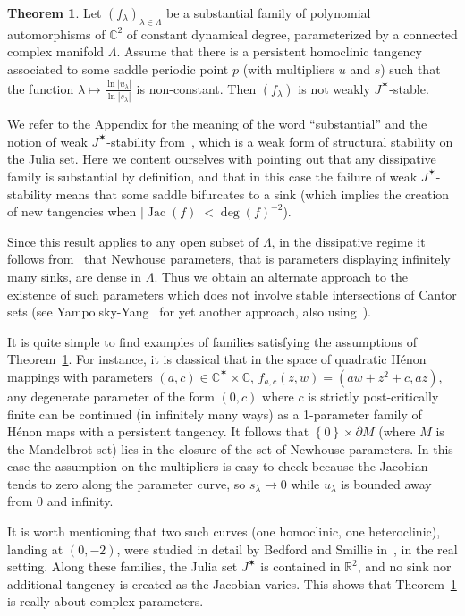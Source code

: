 \documentclass[11pt, oneside]{amsart}
\newcommand{\C}{\mathbb{C}}
\newcommand{\R}{\mathbb{R}}
\newcommand{\fr}{\partial}
\newcommand{\set}[1]{\left\{#1\right\}}
\newcommand{\abs}[1]{\left\vert#1\right\vert}
\newcommand{\jstar}{J^\varstar}
\DeclareMathOperator{\jac}{Jac}
\theoremstyle{remark}
\theoremstyle{definition}
\theoremstyle{theorem}
\newtheorem{mthmB}{Theorem}
\begin{document}
\begin{mthmB}\label{thm:persistent}
Let $(f_\lambda)_{\lambda\in \Lambda}$ be a substantial family of  
polynomial   automorphisms  of $\C^2$ of constant dynamical degree,
 parameterized by a connected complex manifold $\Lambda$. Assume that there is 
 a  persistent homoclinic tangency associated to some saddle periodic point $p$ 
(with multipliers $u$ and $s$) such that 
 the function $\lambda \mapsto \frac{\ln \abs{u_\lambda}}{\ln \abs{s_\lambda}}$ is non-constant. 
Then $(f_\lambda)$ is not weakly $J^\varstar$-stable. 
\end{mthmB}

We refer to the Appendix for 
  the meaning of the word ``substantial'' and the notion of weak $\jstar$-stability from~\cite{tangencies}, which is a weak form of 
  structural stability on the Julia set. Here we content ourselves with 
pointing out  that any dissipative family is substantial by definition, and that in this case the 
failure of weak $\jstar$-stability means that some saddle bifurcates to a sink (which implies the creation of new tangencies when $\abs{\jac(f)} < \deg(f)^{-2}$). 

Since this result applies to any open subset of $\Lambda$, in the dissipative regime 
 it follows from~\cite[Cor. 4.5]{tangencies} 
that Newhouse parameters, that is parameters  displaying  infinitely many sinks,  
 are dense in $\Lambda$. Thus we obtain  an 
alternate approach to the existence of such parameters
which does not involve stable intersections of Cantor sets
(see   Yampolsky-Yang~\cite{yampolsky-yang} for yet another approach, also using~\cite{tangencies}).
 
It is quite simple to find examples of families satisfying the assumptions of 
Theorem~\ref{thm:persistent}. For instance, it is classical that 
in the space of quadratic Hénon mappings with parameters 
$(a,c)\in \C^\varstar\times \C$, 
$f_{a, c}(z,w) = (aw+z^2+c, az)$, any degenerate parameter of the form 
$(0, c)$ where $c$ is strictly post-critically finite can be continued (in infinitely many ways) 
as a 1-parameter family of Hénon maps   with a persistent tangency. 
It follows that $\set{0}\times \fr M $ (where $M$ is the Mandelbrot set)
lies in the closure of the set of Newhouse parameters. In this case  the assumption on the multipliers 
is easy to check because the Jacobian tends to zero along the  parameter curve, so $s_\lambda\to 0$ while 
$u_\lambda$ is bounded away from 0 and infinity.  
 
It is worth mentioning that  two such  curves (one homoclinic, one heteroclinic), landing at $(0, -2)$, 
were studied in detail  by Bedford and Smillie in~\cite{BS_R1, BS_R2}, in the real setting. Along these families, the Julia set $\jstar$ is contained in $\R^2$, and no sink nor  additional tangency is created as the Jacobian varies. This shows that Theorem~\ref{thm:persistent} is really about complex parameters. 
 
\end{document}

